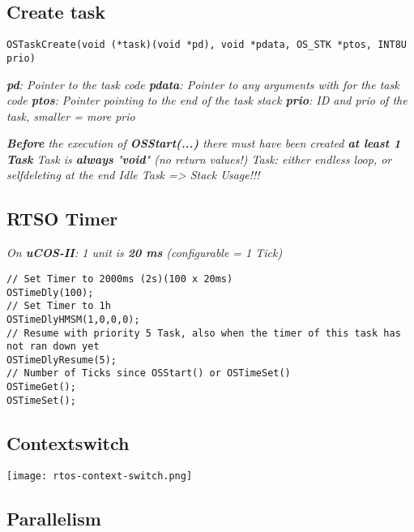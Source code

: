 \subsection{Create task}

\begin{lstlisting}
OSTaskCreate(void (*task)(void *pd), void *pdata, OS_STK *ptos, INT8U prio)
\end{lstlisting}

\textit{
    \textbf{pd}: Pointer to the task code \newline
    \textbf{pdata}: Pointer to any arguments with for the task code \newline
    \textbf{ptos}: Pointer pointing to the end of the task stack \newline
    \textbf{prio}: ID and prio of the task, smaller = more prio
}

\textit{
    \textbf{Before} the execution of \textbf{OSStart(...)} there must have been
    created \textbf{at least 1 Task}\newline
    Task is \textbf{always} "\textbf{void}" (no return values!)\newline
    Task: either endless loop, or selfdeleting at the end\newline
    Idle Task => Stack Usage!!!
}

\subsection{RTSO Timer}

\textit{
    On \textbf{uCOS-II}: 1 unit is \textbf{20 ms} (configurable = 1 Tick)
}

\begin{lstlisting}
// Set Timer to 2000ms (2s)(100 x 20ms)
OSTimeDly(100);
// Set Timer to 1h
OSTimeDlyHMSM(1,0,0,0);
// Resume with priority 5 Task, also when the timer of this task has not ran down yet
OSTimeDlyResume(5);
// Number of Ticks since OSStart() or OSTimeSet()
OSTimeGet();
OSTimeSet();
\end{lstlisting}

\subsection{Contextswitch}

\texttt{[image: rtos-context-switch.png]}

\subsection{Parallelism}

